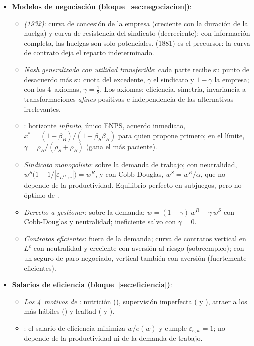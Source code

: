\documentclass[11pt]{article}
\begin{document}
\begin{itemize}
\item \textbf{Modelos de negociación (bloque~\ref{sec:negociacion})}:
  \begin{itemize}
  \item \emph{ (1932)}: curva de concesión de la empresa (creciente con la duración de la huelga) y curva de resistencia del sindicato (decreciente); con información completa, las huelgas son solo potenciales.  (1881) es el precursor: la curva de contrato deja el reparto indeterminado.
  \item \emph{Nash generalizada con utilidad transferible}: cada parte recibe su punto de desacuerdo más su cuota del excedente, $\gamma$ el sindicato y $1-\gamma$ la empresa; con los 4~axiomas, $\gamma=\tfrac{1}{2}$. Los axiomas: eficiencia, simetría, invariancia a transformaciones \emph{afines} positivas e independencia de las alternativas irrelevantes.
  \item \emph{}: horizonte \emph{infinito}, único ENPS, acuerdo inmediato, $x^*=(1-\beta_B)/(1-\beta_S\beta_B)$ para quien propone primero; en el límite, $\gamma=\rho_B/(\rho_S+\rho_B)$ (gana el más paciente).
  \item \emph{Sindicato monopolista}: sobre la demanda de trabajo; con neutralidad, $w^S\big(1-1/|\varepsilon_{L^D,w}|\big)=w^R$, y con Cobb-Douglas, $w^S=w^R/\alpha$, que no depende de la productividad. Equilibrio perfecto en subjuegos, pero no óptimo de .
  \item \emph{Derecho a gestionar}: sobre la demanda; $w=(1-\gamma)\,w^R+\gamma\,w^S$ con Cobb-Douglas y neutralidad; ineficiente salvo con $\gamma=0$.
  \item \emph{Contratos eficientes}: fuera de la demanda; curva de contratos vertical en $L^c$ con neutralidad y creciente con aversión al riesgo (sobreempleo); con un seguro de paro negociado, vertical también con aversión (fuertemente eficientes).
  \end{itemize}
\item \textbf{Salarios de eficiencia (bloque~\ref{sec:eficiencia})}:
  \begin{itemize}
  \item \emph{Los 4~motivos de }: nutrición (), supervisión imperfecta ( y ), atraer a los más hábiles () y lealtad ( y ).
  \item \emph{}: el salario de eficiencia minimiza $w/e(w)$ y cumple $\varepsilon_{e,w}=1$; no depende de la productividad ni de la demanda de trabajo.

\end{itemize}
\end{itemize}
\end{document}
